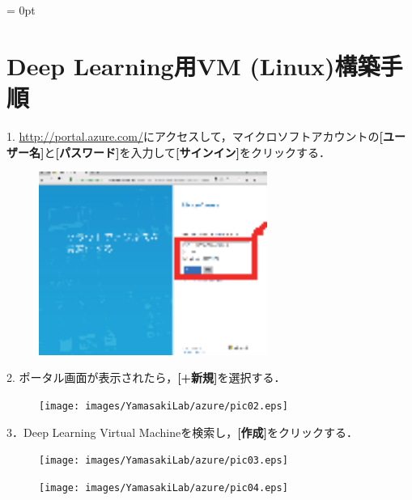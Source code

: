 
\setcounter{section}{0}

\parindent = 0pt

\section*{Deep Learning用VM (Linux)構築手順}
1. \url{http://portal.azure.com/}にアクセスして，マイクロソフトアカウントの{\bf[ユーザー名]}と{\bf[パスワード]}を入力して{\bf[サインイン]}をクリックする．

\begin{figure}[ht]
	\begin{center}
		\includegraphics[height=6cm]
		{images/YamasakiLab/azure/pic01.eps}
	\end{center}
\end{figure}

2. ポータル画面が表示されたら，{\bf[+新規]}を選択する．

\begin{figure}[ht]
	\begin{center}
		\texttt{[image: images/YamasakiLab/azure/pic02.eps]}
	\end{center}
\end{figure}

\newpage

3．Deep Learning Virtual Machineを検索し，{\bf[作成]}をクリックする．

\begin{figure}[ht]
	\begin{center}
		\texttt{[image: images/YamasakiLab/azure/pic03.eps]}
	\end{center}
\end{figure}

\begin{figure}[ht]
	\begin{center}
		\texttt{[image: images/YamasakiLab/azure/pic04.eps]}
	\end{center}
\end{figure}

